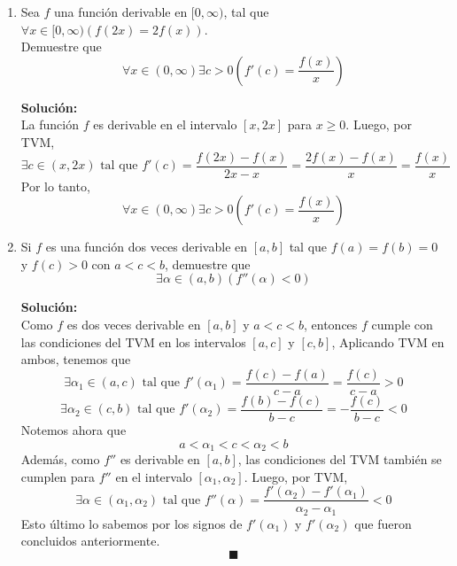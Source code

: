 \documentclass[12pt]{article}
\newenvironment{solucion}
{\begin{mdframed}[backgroundcolor=black!10]
		{\bf Solución:}\\
	}
	{
	\end{mdframed}
}
\newenvironment{preguntas}
{\begin{enumerate}\itemsep12pt
	}
	{
	\end{enumerate}
}
\begin{document}
\begin{preguntas}
\begin{solucion}
En conclusión, la ecuación tiene solución única. 
$$\blacksquare$$
\end{solucion}
\item Sea $f$ una función derivable en $[0, \infty)$, tal que $\forall x \in [0, \infty)(f(2x)=2f(x))$.\\
Demuestre que
$$\forall x \in (0, \infty) \exists c > 0 \left(f'(c) = \dfrac{f(x)}{x}\right)$$
\begin{solucion}
La función $f$ es derivable en el intervalo $[x, 2x]$ para $x \geq 0$. Luego, por TVM,
$$\exists c \in (x,2x) \text{ tal que } f'(c) = \dfrac{f(2x)-f(x)}{2x-x} = \dfrac{2f(x)-f(x)}{x} = \dfrac{f(x)}{x}$$
Por lo tanto,
$$\forall x \in (0, \infty) \exists c > 0 \left(f'(c) = \dfrac{f(x)}{x}\right)$$
\end{solucion}
\item Si $f$ es una función dos veces derivable en $[a,b]$ tal que $f(a)=f(b)=0$ y $f(c) > 0$ con $a < c < b$, demuestre que
$$\exists \alpha \in (a,b) (f''(\alpha) < 0)$$
\begin{solucion}
Como $f$ es dos veces derivable en $[a,b]$ y $a < c < b$, entonces $f$ cumple con las condiciones del TVM en los intervalos $[a,c]$ y $[c,b]$, Aplicando TVM en ambos, tenemos que
$$\exists \alpha_1 \in (a,c) \text{ tal que } f'(\alpha_1) = \dfrac{f(c)-f(a)}{c-a} = \dfrac{f(c)}{c-a} > 0$$
$$\exists \alpha_2 \in (c,b) \text{ tal que } f'(\alpha_2) = \dfrac{f(b)-f(c)}{b-c} = -\dfrac{f(c)}{b-c} < 0$$
Notemos ahora que 
$$a < \alpha_1 < c < \alpha_2 < b$$
Además, como $f''$ es derivable en $[a, b]$, las condiciones del TVM también se cumplen para $f''$ en el intervalo $[\alpha_1, \alpha_2]$. Luego, por TVM,
$$\exists \alpha \in (\alpha_1, \alpha_2) \text{ tal que } f''(\alpha) = \dfrac{f'(\alpha_2) - f'(\alpha_1)}{\alpha_2 - \alpha_1} < 0$$
Esto último lo sabemos por los signos de $f'(\alpha_1)$ y $f'(\alpha_2)$ que fueron concluidos anteriormente.
$$\blacksquare$$
\end{solucion}
\end{preguntas}
\end{document}
